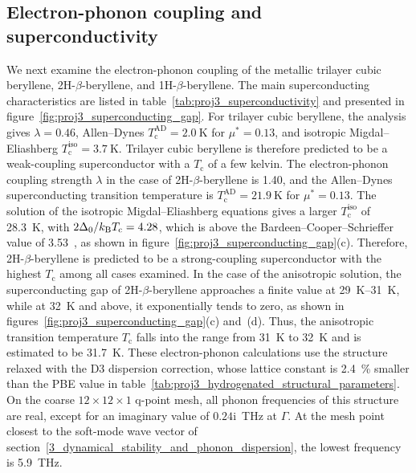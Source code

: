 \subsection{Electron-phonon coupling and superconductivity}
\label{3_superconductivity}

We next examine the electron-phonon coupling of the metallic trilayer cubic beryllene,
2H-$\beta$-beryllene,
and 1H-$\beta$-beryllene.
The main superconducting characteristics are listed in table~\ref{tab:proj3_superconductivity} and presented in figure~\ref{fig:proj3_superconducting_gap}.
For trilayer cubic beryllene,
the analysis gives $\lambda=0.46$,
Allen--Dynes $T_\mathrm{c}^{\mathrm{AD}}=\qty{2.0}{\kelvin}$ for $\mu^*=0.13$,
and isotropic Migdal--Eliashberg $T_\mathrm{c}^{\mathrm{iso}}=\qty{3.7}{\kelvin}$.
Trilayer cubic beryllene is therefore predicted to be a weak-coupling superconductor with a $T_\mathrm{c}$ of a few kelvin.
The electron-phonon coupling strength $\lambda$ in the case of 2H-$\beta$-beryllene is 1.40,
and the Allen--Dynes superconducting transition temperature is $T_\mathrm{c}^{\mathrm{AD}}=\qty{21.9}{\kelvin}$ for $\mu^*=0.13$.
The solution of the isotropic Migdal--Eliashberg equations gives a larger $T_\mathrm{c}^{\mathrm{iso}}$ of \qty{28.3}{\kelvin},
with $2\Delta_0/k_\mathrm{B} T_\mathrm{c}=4.28$,
which is above the Bardeen--Cooper--Schrieffer value of 3.53~\cite{bardeen1957theory},
as shown in figure~\ref{fig:proj3_superconducting_gap}(c).
Therefore, 2H-$\beta$-beryllene is predicted to be a strong-coupling superconductor with the highest $T_\mathrm{c}$ among all cases examined.
In the case of the anisotropic solution,
the superconducting gap of 2H-$\beta$-beryllene approaches a finite value at \qtyrange{29}{31}{\kelvin},
while at \qty{32}{\kelvin} and above,
it exponentially tends to zero,
as shown in figures~\ref{fig:proj3_superconducting_gap}(c) and~(d).
Thus, the anisotropic transition temperature $T_\mathrm{c}$ falls into the range from \qty{31}{\kelvin} to \qty{32}{\kelvin} and is estimated to be \qty{31.7}{\kelvin}.
These electron-phonon calculations use the structure relaxed with the D3 dispersion correction,
whose lattice constant is \qty{2.4}{\percent} smaller than the PBE value in table~\ref{tab:proj3_hydrogenated_structural_parameters}.
On the coarse $12 \times 12 \times 1$ q-point mesh,
all phonon frequencies of this structure are real,
except for an imaginary value of $0.24\mathrm{i}$~\si{\tera\hertz} at $\Gamma$.
At the mesh point closest to the soft-mode wave vector of section~\ref{3_dynamical_stability_and_phonon_dispersion},
the lowest frequency is \qty{5.9}{\tera\hertz}.
